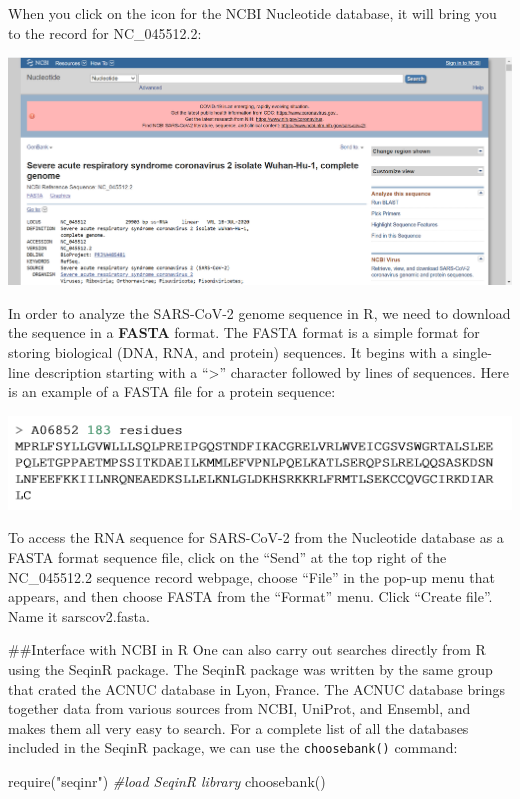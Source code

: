 \documentclass[
]{article}
\newenvironment{Shaded}{\begin{snugshade}}{\end{snugshade}}
\newcommand{\CommentTok}[1]{\textcolor[rgb]{0.56,0.35,0.01}{\textit{#1}}}
\newcommand{\FunctionTok}[1]{\textcolor[rgb]{0.00,0.00,0.00}{#1}}
\newcommand{\NormalTok}[1]{#1}
\newcommand{\StringTok}[1]{\textcolor[rgb]{0.31,0.60,0.02}{#1}}
\begin{document}
When you click on the icon for the NCBI Nucleotide database, it will
bring you to the record for NC\_045512.2:

\includegraphics{./Images/img2.png}

In order to analyze the SARS-CoV-2 genome sequence in R, we need to
download the sequence in a \textbf{FASTA} format. The FASTA format is a
simple format for storing biological (DNA, RNA, and protein) sequences.
It begins with a single-line description starting with a
``\textgreater{}'' character followed by lines of sequences. Here is an
example of a FASTA file for a protein sequence:

\includegraphics{./Images/img3.png}

To access the RNA sequence for SARS-CoV-2 from the Nucleotide database
as a FASTA format sequence file, click on the ``Send'' at the top right
of the NC\_045512.2 sequence record webpage, choose ``File'' in the
pop-up menu that appears, and then choose FASTA from the ``Format''
menu. Click ``Create file''. Name it sarscov2.fasta.

\#\#Interface with NCBI in R One can also carry out searches directly
from R using the SeqinR package. The SeqinR package was written by the
same group that crated the ACNUC database in Lyon, France. The ACNUC
database brings together data from various sources from NCBI, UniProt,
and Ensembl, and makes them all very easy to search. For a complete list
of all the databases included in the SeqinR package, we can use the
\texttt{choosebank()} command:

\begin{Shaded}
\begin{Highlighting}[]
\FunctionTok{require}\NormalTok{(}\StringTok{"seqinr"}\NormalTok{) }\CommentTok{\#load SeqinR library}
\FunctionTok{choosebank}\NormalTok{()}
\end{Highlighting}
\end{Shaded}
\end{document}
